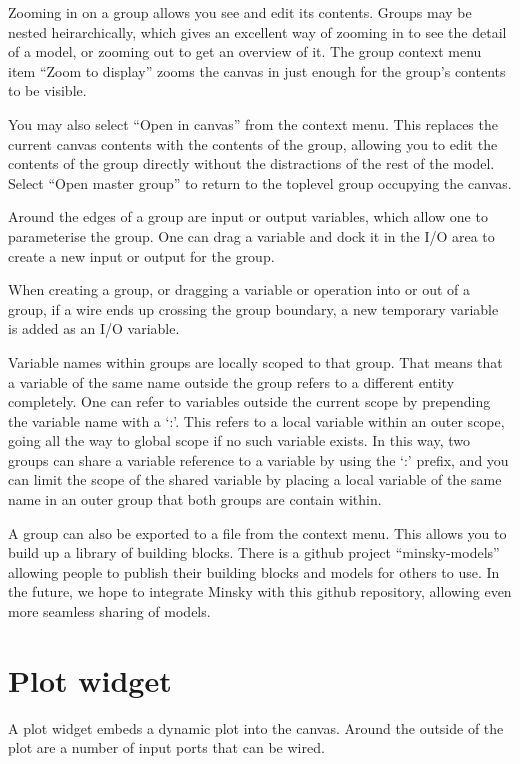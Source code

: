 Zooming in on a group allows you see and edit its contents. Groups may
be nested heirarchically, which gives an excellent way of zooming in
to see the detail of a model, or zooming out to get an overview of
it. The group context menu item ``Zoom to display'' zooms the canvas
in just enough for the group's contents to be visible.

You may also select ``Open in canvas'' from the context menu. This
replaces the current canvas contents with the contents of the group,
allowing you to edit the contents of the group directly without the
distractions of the rest of the model. Select ``Open master group'' to
return to the toplevel group occupying the canvas.

Around the edges of a group are input or output variables, which allow
one to parameterise the group. One can drag a variable and dock it in
the I/O area to create a new input or output for the group.

When creating a group, or dragging a variable or operation into or out
of a group, if a wire ends up crossing the group boundary, a new
temporary variable is added as an I/O variable.

Variable names within groups are locally scoped to that group. That
means that a variable of the same name outside the group refers to a
different entity completely. One can refer to variables outside the
current scope by prepending the variable name with a `:'. This refers
to a local variable within an outer scope, going all the way to global
scope if no such variable exists. In this way, two groups can share
a variable reference to a variable by using the `:' prefix, and you
can limit the scope of the shared variable by placing a local variable
of the same name in an outer group that both groups are contain within.

A group can also be exported to a file from the context menu.
This allows you to build up a library of building blocks. There is a
github project ``minsky-models'' allowing people to publish their
building blocks and models for others to use. In the future, we hope
to integrate Minsky with this github repository, allowing even more
seamless sharing of models.

\section{Plot widget}
\label{PlotWidget}

A plot widget embeds a dynamic plot into the canvas. Around the
outside of the plot are a number of input ports that can be wired.

